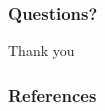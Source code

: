 \documentclass[table]{beamer}
\begin{document}






\begin{frame}
	\frametitle{Questions?}
	
	\vfill
	\centerline{\Huge Thank you}
	\vfill
\end{frame}












\begin{frame}[allowframebreaks]
        \frametitle{References}
        {\scriptsize
        
        }
\end{frame}    
\end{document}
